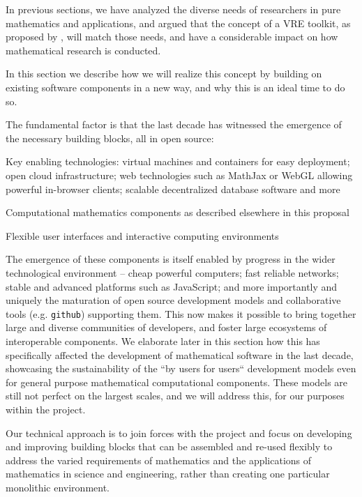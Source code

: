 In previous sections, we have analyzed the diverse needs of
researchers in pure mathematics and applications, and argued that the
concept of a VRE toolkit, as proposed by \TheProject, will match those
needs, and have a considerable impact on how mathematical research is
conducted.

In this section we describe how we will realize this concept by
building on existing software components in a new way, and why
this is an ideal time to do so.
\begin{framed}
  The fundamental factor is that the last decade has witnessed the
  emergence of the necessary building blocks, all in open source:
  \begin{compactitem}
  \item Key enabling technologies: virtual machines and containers for easy
    deployment; open cloud infrastructure; web technologies
    such as MathJax or WebGL allowing powerful in-browser clients; scalable
    decentralized database software and more
  \item Computational mathematics components as described elsewhere in
    this proposal
  \item Flexible user interfaces and interactive computing environments
  \end{compactitem}
\end{framed}

The emergence of these components is itself enabled by progress in the
wider technological environment -- cheap powerful computers; fast
reliable networks; stable and advanced platforms such as JavaScript;
and more importantly and uniquely the maturation of open source
development models and collaborative tools (e.g. \texttt{github})
supporting them. This now
makes it possible to  bring together large and diverse communities of
developers, and foster large ecosystems of interoperable
components. We elaborate later in this section how this has
specifically affected the development of mathematical software in the
last decade, showcasing the sustainability of the ``by users for
users`` development models even for general purpose mathematical
computational components. These models are still not perfect on the
largest scales, and we will address this, for our purposes within the project.

\begin{framed}
  Our technical approach is to join forces with the \Jupyter project and focus on developing
  and improving building blocks that can be
  assembled and re-used flexibly to address the varied
  requirements of mathematics and the applications of mathematics in
  science and engineering, rather than creating one particular
  monolithic environment.
\end{framed}
